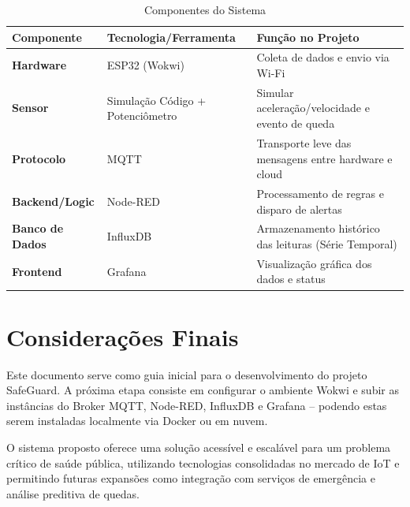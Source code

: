 \documentclass[a4paper,12pt]{article}
\begin{document}
\begin{table}[H]
\centering
\caption{Componentes do Sistema}
\label{tab:componentes}
\begin{tabular}{>{\bfseries}l l l}
\toprule
\textbf{Componente} & \textbf{Tecnologia/Ferramenta} & \textbf{Função no Projeto} \\
\midrule
Hardware & ESP32 (Wokwi) & Coleta de dados e envio via Wi-Fi \\
Sensor & Simulação Código + Potenciômetro & Simular aceleração/velocidade e evento de queda \\
Protocolo & MQTT & Transporte leve das mensagens entre hardware e cloud \\
Backend/Logic & Node-RED & Processamento de regras e disparo de alertas \\
Banco de Dados & InfluxDB & Armazenamento histórico das leituras (Série Temporal) \\
Frontend & Grafana & Visualização gráfica dos dados e status \\
\bottomrule
\end{tabular}
\end{table}

\section{Considerações Finais}

Este documento serve como guia inicial para o desenvolvimento do projeto SafeGuard. A próxima etapa consiste em configurar o ambiente Wokwi e subir as instâncias do Broker MQTT, Node-RED, InfluxDB e Grafana -- podendo estas serem instaladas localmente via Docker ou em nuvem.

O sistema proposto oferece uma solução acessível e escalável para um problema crítico de saúde pública, utilizando tecnologias consolidadas no mercado de IoT e permitindo futuras expansões como integração com serviços de emergência e análise preditiva de quedas.
\end{document}

